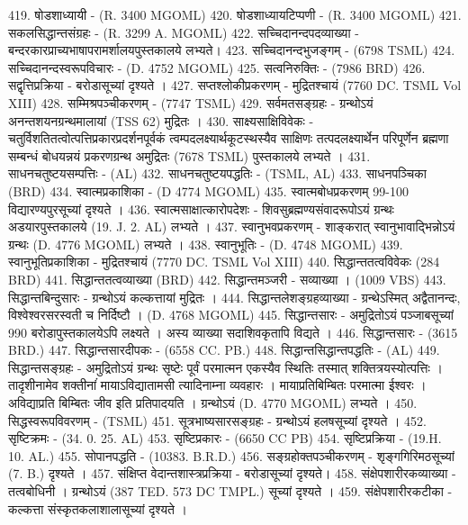 419. षोडशाध्यायी - (R. 3400 MGOML)
420. षोडशाध्यायटिप्पणी - (R. 3400 MGOML)
421. सकलसिद्धान्तसंग्रहः - (R. 3299 A. MGOML)
422. सच्चिदानन्दपदव्याख्या - बन्दरकारप्राच्यभाषापरामर्शालयपुस्तकालये लभ्यते। 
423. सच्चिदानन्दभुजङ्गम् - (6798 TSML)
424. सच्चिदानन्दस्वरूपविचारः - (D. 4752 MGOML)
425. सत्वनिरुक्तिः - (7986 BRD)
426. सद्वृत्तिप्रक्रिया - बरोडासूच्यां दृश्यते । 
427. सप्तश्लोकीप्रकरणम् - मुद्रितश्चायं (7760 DC. TSML Vol XIII)
428. सम्मिश्रपञ्चीकरणम् - (7747 TSML)
429. सर्वमतसङ्ग्रहः - ग्रन्थोऽयं अनन्तशयनग्रन्थमालायां (TSS 62) मुद्रितः । 
430. साक्ष्यसाक्षिविवेकः - चतुर्विशतितत्वोत्पत्तिप्रकारप्रदर्शनपूर्वकं त्वम्पदलक्ष्यार्थकूटस्थस्यैव साक्षिणः तत्पदलक्ष्यार्थेन परिपूर्णेन ब्रह्मणा सम्बन्धं बोधयन्नयं प्रकरणग्रन्थ अमुद्रितः (7678 TSML) पुस्तकालये लभ्यते । 
431. साधनचतुष्टयसम्पत्तिः - (AL)
432. साधनचतुष्टयपद्धतिः - (TSML, AL)
433. साधनपञ्चिका (BRD)
434. स्वात्मप्रकाशिका - (D 4774 MGOML)
435. स्वात्मबोधप्रकरणम् 99-100 विद्यारण्यपुरसूच्यां दृश्यते । 
436. स्वात्मसाक्षात्कारोपदेशः - शिवसुब्रह्मण्यसंवादरूपोऽयं ग्रन्थः अडयारपुस्तकालये (19. J. 2. AL) लभ्यते । 
437. स्वानुभवप्रकरणम् - शाङ्करात् स्वानुभावाद्भिन्नोऽयं ग्रन्थः (D. 4776 MGOML) लभ्यते । 
438. स्वानुभूतिः - (D. 4748 MGOML)
439. स्वानुभूतिप्रकाशिका - मुद्रितश्चायं (7770 DC. TSML Vol XIII)
440. सिद्धान्ततत्वविवेकः (284 BRD)
441. सिद्धान्ततत्वव्याख्या (BRD)
442. सिद्धान्तमञ्जरी - सव्याख्या । (1009 VBS)
443. सिद्धान्तबिन्दुसारः - ग्रन्थोऽयं कल्कत्तायां मुद्रितः । 
444. सिद्धान्तलेशङ्ग्रहव्याख्या - ग्रन्थेऽस्मित् अद्वैतानन्दः, विश्वेश्वरसरस्वती च निर्दिष्टौ । (D. 4768 MGOML)
445. सिद्धान्तसारः - अमुद्रितोऽयं पञ्जाबसूच्यां 990	बरोडापुस्तकालयेऽपि लक्ष्यते । अस्य व्याख्या सदाशिवकृतापि विद्यते । 
446. सिद्धान्तसारः - (3615 BRD.)
447. सिद्धान्तसारदीपकः - (6558 CC. PB.)
448. सिद्धान्तसिद्धान्तपद्धतिः - (AL)
449. सिद्धान्तसङ्ग्रहः - अमुद्रितोऽयं ग्रन्थः सृष्टेः पूर्वं परमात्मन एकस्यैव स्थितिः तस्मात् शक्तित्रयस्योत्पत्तिः । तादृशीनामेव शक्तीनांं मायाऽविद्यातामसी त्यादिनाम्ना व्यवहारः । मायाप्रतिबिम्बितः परमात्मा ईश्वरः । अविद्याप्रति बिम्बितः जीव इति प्रतिपादयति । ग्रन्थोऽयं (D. 4770 MGOML) लभ्यते । 
450. सिद्धस्वरूपविवरणम् - (TSML)
451. सूत्रभाष्यसारसङ्ग्रहः - ग्रन्थोऽयं हलषसूच्यां दृश्यते ।
452. सृष्टिक्रमः - (34. 0. 25. AL)
453. सृष्टिप्रकारः - (6650 CC PB)
454. सृष्टिप्रक्रिया - (19.H. 10. AL.)
455. सोपानपद्धति - (10383. B.R.D.)
456. सङ्ग्रहोक्तपञ्चीकरणम् - शृङ्गगिरिमठसूच्यां (7. B.) दृश्यते । 
457. संक्षिप्त वेदान्तशास्त्रप्रक्रिया - बरोडासूच्यां दृश्यते। 
458. संक्षेपशारीरकव्याख्या - तत्वबोधिनी । ग्रन्थोऽयं (387 TED. 573 DC TMPL.) सूच्यां दृश्यते । 
459. संक्षेपशारीरकटीका - कल्कत्ता संस्कृतकलाशालासूच्यां दृश्यते । 
